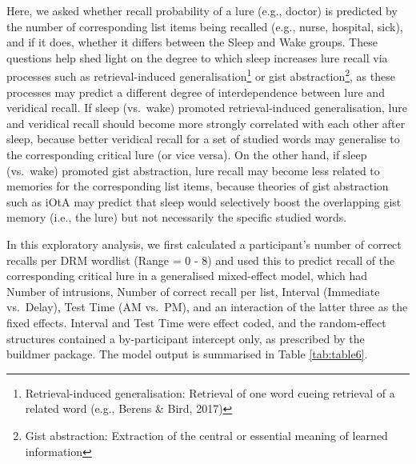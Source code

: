\documentclass[
]{article}
\begin{document}
Here, we asked whether recall probability of a lure (e.g., doctor) is predicted by the number of corresponding list items being recalled (e.g., nurse, hospital, sick), and if it does, whether it differs between the Sleep and Wake groups. These questions help shed light on the degree to which sleep increases lure recall via processes such as retrieval-induced generalisation\footnote{Retrieval-induced generalisation: Retrieval of one word cueing retrieval of a related word (e.g., Berens \& Bird, 2017)} or gist abstraction\footnote{Gist abstraction: Extraction of the central or essential meaning of learned information}, as these processes may predict a different degree of interdependence between lure and veridical recall. If sleep (vs.~wake) promoted retrieval-induced generalisation, lure and veridical recall should become more strongly correlated with each other after sleep, because better veridical recall for a set of studied words may generalise to the corresponding critical lure (or vice versa). On the other hand, if sleep (vs.~wake) promoted gist abstraction, lure recall may become less related to memories for the corresponding list items, because theories of gist abstraction such as iOtA may predict that sleep would selectively boost the overlapping gist memory (i.e., the lure) but not necessarily the specific studied words.

In this exploratory analysis, we first calculated a participant's number of correct recalls per DRM wordlist (Range = 0 - 8) and used this to predict recall of the corresponding critical lure in a generalised mixed-effect model, which had Number of intrusions, Number of correct recall per list, Interval (Immediate vs.~Delay), Test Time (AM vs.~PM), and an interaction of the latter three as the fixed effects. Interval and Test Time were effect coded, and the random-effect structures contained a by-participant intercept only, as prescribed by the buildmer package. The model output is summarised in Table \ref{tab:table6}.
\end{document}
